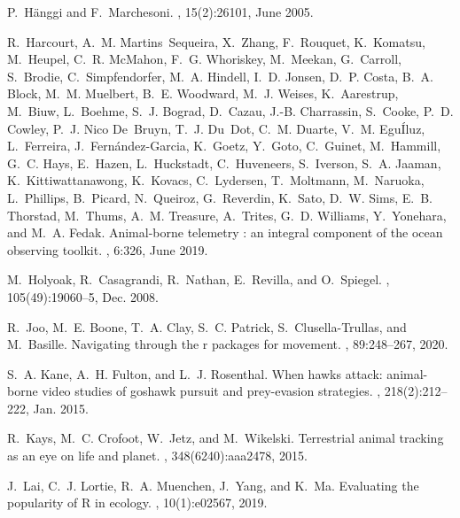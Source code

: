 \documentclass[a4paper,12pt]{article}
\begin{document}
\begin{thebibliography}{10}
	P.~H\"{a}nggi and F.~Marchesoni.
	, 15(2):26101, June 2005.
	
	R.~Harcourt, A.~M. Martins~Sequeira, X.~Zhang, F.~Rouquet, K.~Komatsu,
	M.~Heupel, C.~R. McMahon, F.~G. Whoriskey, M.~Meekan, G.~Carroll, S.~Brodie,
	C.~Simpfendorfer, M.~A. Hindell, I.~D. Jonsen, D.~P. Costa, B.~A. Block,
	M.~M. Muelbert, B.~E. Woodward, M.~J. Weises, K.~Aarestrup, M.~Biuw,
	L.~Boehme, S.~J. Bograd, D.~Cazau, J.-B. Charrassin, S.~Cooke, P.~D. Cowley,
	P.~J. Nico De~Bruyn, T.~J. Du~Dot, C.~M. Duarte, V.~M. EguÍluz, L.~Ferreira,
	J.~Fernández-Garcia, K.~Goetz, Y.~Goto, C.~Guinet, M.~Hammill, G.~C. Hays,
	E.~Hazen, L.~Huckstadt, C.~Huveneers, S.~Iverson, S.~A. Jaaman,
	K.~Kittiwattanawong, K.~Kovacs, C.~Lydersen, T.~Moltmann, M.~Naruoka,
	L.~Phillips, B.~Picard, N.~Queiroz, G.~Reverdin, K.~Sato, D.~W. Sims, E.~B.
	Thorstad, M.~Thums, A.~M. Treasure, A.~Trites, G.~D. Williams, Y.~Yonehara,
	and M.~A. Fedak.
	\newblock Animal-borne telemetry : an integral component of the ocean observing
	toolkit.
	, 6:326, June 2019.
	
	M.~Holyoak, R.~Casagrandi, R.~Nathan, E.~Revilla, and O.~Spiegel.
	, 105(49):19060--5, Dec. 2008.
	
	R.~Joo, M.~E. Boone, T.~A. Clay, S.~C. Patrick, S.~Clusella-Trullas, and
	M.~Basille.
	\newblock Navigating through the r packages for movement.
	, 89:248--267, 2020.
	
	S.~A. Kane, A.~H. Fulton, and L.~J. Rosenthal.
	\newblock When hawks attack: animal-borne video studies of goshawk pursuit and
	prey-evasion strategies.
	, 218(2):212--222, Jan. 2015.
	
	R.~Kays, M.~C. Crofoot, W.~Jetz, and M.~Wikelski.
	\newblock Terrestrial animal tracking as an eye on life and planet.
	, 348(6240):aaa2478, 2015.
	
	J.~Lai, C.~J. Lortie, R.~A. Muenchen, J.~Yang, and K.~Ma.
	\newblock Evaluating the popularity of {R} in ecology.
	, 10(1):e02567, 2019.
	

\end{thebibliography}
\end{document}
